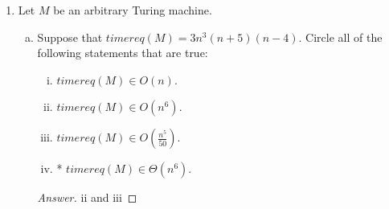\documentclass[10pt]{article}
\newcommand{\card}[1]{\left| #1 \right|}
\newcommand{\brackets}[1]{\left< #1 \right>}
\begin{document}
\begin{enumerate}[1)]
For whatever reason (malevolence or incompetence), it turns out that $Oops$ has the property that, for all input pairs, it outputs the value \texttt{F}.\\

For this problem, we’ll say that two TMs are equivalent iff they compute the same function (i.e., they halt on the same inputs and, when they halt, they output the same value).\\

Define $L = \{\brackets{M}$ : $M$ is equivalent to $Oops$\}.  Is $L$ in D, SD/D or $\lnot$SD?  Prove your answer.
\begin{proof}[Answer]
$\lnot$SD.
\end{proof}
\begin{proof}[Proof]
Assume by way of contradiction that this language $L$ is semi-decidable.  Then there exists some machine $Oracle(\brackets{M})$ which semi-decides it.  Let $R$ be a reduction from $\brackets{M, w}$ to $\brackets{M\#}$ as follows:
\begin{enumerate}[1.]
\item
Write $x$ to a second tape.
\item
Erase the tape.
\item
Write $w$ on the tape.
\item
Run $M$ on $w$ for $\card{x}$ steps.
\item
If $M$ halted naturally, loop
\item
Output \texttt{F}
\end{enumerate}
Then let $C(\brackets{M, w}) = Oracle(R(\brackets{M, w}))$.\\
If $\brackets{M, w} \in \lnot H$: $M$ never halts naturally, so $M\#$ outputs \texttt{F}, making it equivalent to $oops$, so $Oracle$ accepts.\\
If $\brackets{M, w} \not \in \lnot H$: there are some inputs $x$ to $M\#$ on which $M$ halts natually, so on these inputs $M\#$ does not output \texttt{F}, so $Oracle$ rejects.\\
Therefore $C$ decides $\lnot$H, and we know that no such machine exists, so we have a contradiction.  Therefore this language is not decidable.
\end{proof}


\item
Let $M$ be an arbitrary Turing machine.
\begin{enumerate}[a)]
\item
Suppose that $timereq(M) = 3n^3(n+5)(n-4)$.  Circle all of the following statements that are true:
\begin{enumerate}[i)]
\item
$timereq(M) \in O(n)$.
\item
$timereq(M) \in O(n^6)$.
\item
$timereq(M) \in O(\frac{n^5}{50})$.
\item
* $timereq(M) \in \Theta(n^6)$.
\end{enumerate}
\begin{proof}[Answer]
ii and iii
\end{proof}


\end{enumerate}
\end{enumerate}
\end{document}
